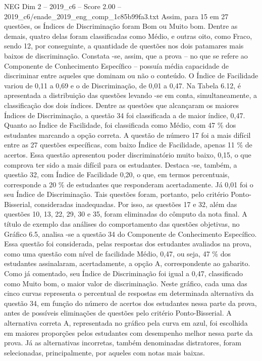 \begin{textsample}{NEG Dim 2 – 2019\_c6 – Score 2.00 – 2019\_c6/enade\_2019\_eng\_comp\_1c85b99fa3.txt}
Assim, para 15 em 27 questões, os Índices de Discriminação foram Bom ou Muito bom.
Dentre as demais, quatro delas foram classificadas como Médio, e outras oito, como Fraco, sendo 12, por conseguinte, a quantidade de questões nos dois patamares mais baixos de discriminação.
Constata -se, assim, que a prova – no que se refere ao Componente de Conhecimento Específico – possuía média capacidade de discriminar entre aqueles que dominam ou não o conteúdo.
O Índice de Facilidade variou de 0,11 a 0,69 e o de Discriminação, de 0,01 a 0,47.
Na Tabela 6.12, é apresentada a distribuição das questões levando -se em conta, simultaneamente, a classificação dos dois índices.
Dentre as questões que alcançaram os maiores Índices de Discriminação, a questão 34 foi classificada a de maior índice, 0,47.
Quanto ao Índice de Facilidade, foi classificada como Médio, com 47 \% dos estudantes marcando a opção correta.
A questão de número 17 foi a mais difícil entre as 27 questões específicas, com baixo Índice de Facilidade, apenas 11 \% de acertos.
Essa questão apresentou poder discriminatório muito baixo, 0,15, o que comprova ter sido a mais difícil para os estudantes.
Destaca -se, também, a questão 32, com Índice de Facilidade 0,20, o que, em termos percentuais, corresponde a 20 \% de estudantes que responderam acertadamente.
Já 0,01 foi o seu Índice de Discriminação.
Tais questões foram, portanto, pelo critério Ponto-Bisserial, consideradas inadequadas.
Por isso, as questões 17 e 32, além das questões 10, 13, 22, 29, 30 e 35, foram eliminadas do cômputo da nota final.
A título de exemplo das análises do comportamento das questões objetivas, no Gráfico 6.5, analisa -se a questão 34 do Componente de Conhecimento Específico.
Essa questão foi considerada, pelas respostas dos estudantes avaliados na prova, como uma questão com nível de facilidade Médio, 0,47, ou seja, 47 \% dos estudantes assinalaram, acertadamente, a opção A, correspondente ao gabarito.
Como já comentado, seu Índice de Discriminação foi igual a 0,47, classificado como Muito bom, o maior valor de discriminação.
Neste gráfico, cada uma das cinco curvas representa o percentual de respostas em determinada alternativa da questão 34, em função do número de acertos dos estudantes nessa parte da prova, antes de possíveis eliminações de questões pelo critério Ponto-Bisserial.
A alternativa correta A, representada no gráfico pela curva em azul, foi escolhida em maiores proporções pelos estudantes com desempenho melhor nessa parte da prova.
Já as alternativas incorretas, também denominadas distratores, foram selecionadas, principalmente, por aqueles com notas mais baixas.

\end{textsample}
